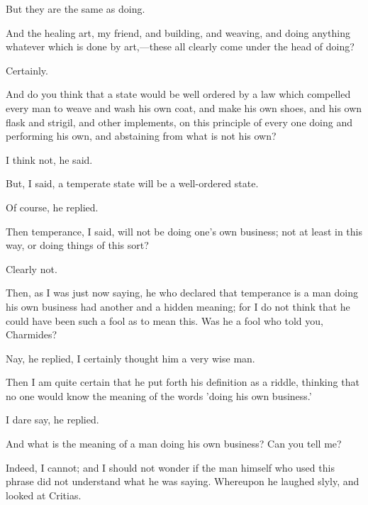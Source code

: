 \documentclass[11pt,letter]{article}
\begin{document}
\par  But they are the same as doing.

\par  And the healing art, my friend, and building, and weaving, and doing anything whatever which is done by art,—these all clearly come under the head of doing?

\par  Certainly.

\par  And do you think that a state would be well ordered by a law which compelled every man to weave and wash his own coat, and make his own shoes, and his own flask and strigil, and other implements, on this principle of every one doing and performing his own, and abstaining from what is not his own?

\par  I think not, he said.

\par  But, I said, a temperate state will be a well-ordered state.

\par  Of course, he replied.

\par  Then temperance, I said, will not be doing one's own business; not at least in this way, or doing things of this sort?

\par  Clearly not.

\par  Then, as I was just now saying, he who declared that temperance is a man doing his own business had another and a hidden meaning; for I do not think that he could have been such a fool as to mean this. Was he a fool who told you, Charmides?

\par  Nay, he replied, I certainly thought him a very wise man.

\par  Then I am quite certain that he put forth his definition as a riddle, thinking that no one would know the meaning of the words 'doing his own business.'

\par  I dare say, he replied.

\par  And what is the meaning of a man doing his own business? Can you tell me?

\par  Indeed, I cannot; and I should not wonder if the man himself who used this phrase did not understand what he was saying. Whereupon he laughed slyly, and looked at Critias.
\end{document}
